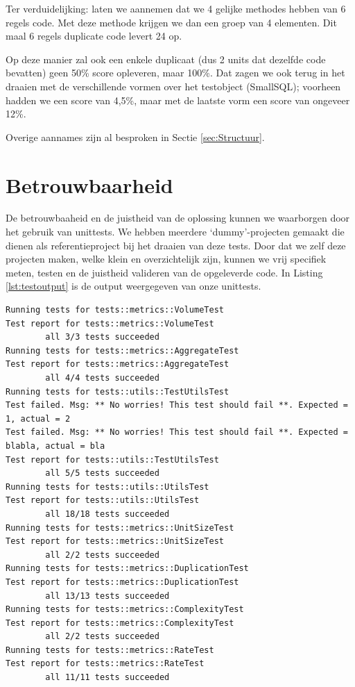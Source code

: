 \documentclass[a4paper]{article}
\begin{document}
Ter verduidelijking: laten we aannemen dat we 4 gelijke methodes hebben van 6 regels code.  Met deze methode krijgen we dan een groep van 4 elementen. Dit maal 6 regels duplicate code levert 24 op.

Op deze manier zal ook een enkele duplicaat (dus 2 units dat dezelfde code bevatten) geen 50\% score opleveren, maar 100\%. Dat zagen we ook terug in het draaien met de verschillende vormen over het testobject (SmallSQL); voorheen hadden we een score van 4,5\%, maar met de laatste vorm een score van ongeveer 12\%.

Overige aannames zijn al besproken in Sectie \ref{sec:Structuur}.

\section{Betrouwbaarheid}
De betrouwbaaheid en de juistheid van de oplossing kunnen we waarborgen door het gebruik van unittests. 
We hebben meerdere `dummy'-projecten gemaakt die dienen als referentieproject bij het draaien van deze tests. 
Door dat we zelf deze projecten maken, welke klein en overzichtelijk zijn, kunnen we vrij specifiek meten, testen en de juistheid valideren van de opgeleverde code. In Listing \ref{lst:testoutput} is de output weergegeven van onze unittests.
\begin{lstlisting}[caption={Unit test output},label={lst:testoutput},frame = single]
Running tests for tests::metrics::VolumeTest
Test report for tests::metrics::VolumeTest                                                
        all 3/3 tests succeeded
Running tests for tests::metrics::AggregateTest
Test report for tests::metrics::AggregateTest                                             
        all 4/4 tests succeeded
Running tests for tests::utils::TestUtilsTest
Test failed. Msg: ** No worries! This test should fail **. Expected = 1, actual = 2       
Test failed. Msg: ** No worries! This test should fail **. Expected = blabla, actual = bla
Test report for tests::utils::TestUtilsTest                                 
        all 5/5 tests succeeded
Running tests for tests::utils::UtilsTest
Test report for tests::utils::UtilsTest                                                     
        all 18/18 tests succeeded
Running tests for tests::metrics::UnitSizeTest
Test report for tests::metrics::UnitSizeTest                                              
        all 2/2 tests succeeded
Running tests for tests::metrics::DuplicationTest
Test report for tests::metrics::DuplicationTest                                             
        all 13/13 tests succeeded
Running tests for tests::metrics::ComplexityTest
Test report for tests::metrics::ComplexityTest                                            
        all 2/2 tests succeeded
Running tests for tests::metrics::RateTest
Test report for tests::metrics::RateTest                                                    
        all 11/11 tests succeeded
\end{lstlisting}
\end{document}
